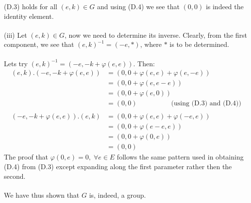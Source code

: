 \documentclass[12pt,a4paper]{article}
\begin{document}
(D.3) holds for all $(e,k) \in G$ and using (D.4) we see that $(0,0)$ is indeed the identity element.\\
\\
(iii) Let $(e,k) \in G$, now we need to determine its inverse.  Clearly, from the first component, we see that $(e,k)^{-1} = (-e, *)$, where $*$ is to be determined.\\
\\
Lets try $(e,k)^{-1} = (-e, -k + \varphi(e,e))$.  Then:
\begin{align*}
  (e,k).(-e,-k + \varphi(e,e)) &= (0, 0 + \varphi(e,e) + \varphi(e,-e)) \\
  &= (0, 0 + \varphi(e,e-e)) \\
  &= (0, 0 + \varphi(e,0)) \\
  &= (0, 0) \;\;\;\;\;\;\;\;\;\;\;\;\;\;\;\;\;\; \text{(using (D.3) and (D.4))} \\
  \\
  (-e,-k + \varphi(e,e)).(e,k) &= (0, 0 + \varphi(e,e) + \varphi(-e,e)) \\
  &= (0, 0 + \varphi(e-e,e)) \\
  &= (0, 0 + \varphi(0,e)) \\
  &= (0,0)
\end{align*}
The proof that $\varphi(0,e)=0, \; \forall e \in E$ follows the same pattern used in obtaining (D.4) from (D.3) except expanding along the first parameter rather then
the second.\\
\\
We have thus shown that $G$ is, indeed, a group.
\end{document}
